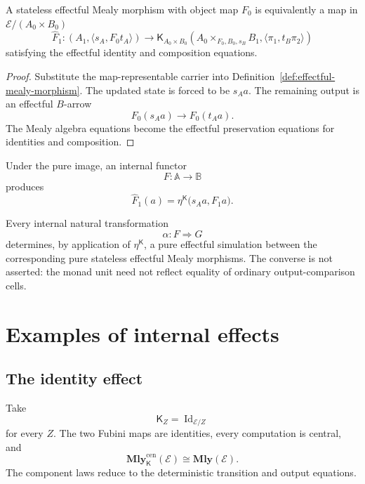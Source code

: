 \begin{proposition}
\label{prop:stateless-effectful-mealy}
A stateless effectful Mealy morphism with object map \(F_0\) is equivalently
a map in \(\mathcal E/(A_0\times B_0)\)
\[
\widehat F_1:
\left(
    A_1,
    \langle s_A,F_0t_A\rangle
\right)
\longrightarrow
\mathsf K_{A_0\times B_0}
\left(
    A_0\times_{F_0,B_0,s_B}B_1,
    \langle\pi_1,t_B\pi_2\rangle
\right)
\]
satisfying the effectful identity and composition equations.
\end{proposition}

\begin{proof}
Substitute the map-representable carrier into
Definition~\ref{def:effectful-mealy-morphism}.  The updated state is forced
to be \(s_Aa\).  The remaining output is an effectful \(B\)-arrow
\[
    F_0(s_Aa)\longrightarrow F_0(t_Aa).
\]
The Mealy algebra equations become the effectful preservation equations for
identities and composition.
\end{proof}

Under the pure image, an internal functor
\[
    F:\mathbb A\longrightarrow\mathbb B
\]
produces
\[
    \widehat F_1(a)
    =
    \eta^{\mathsf K}
    \bigl(
        s_Aa,
        F_1a
    \bigr).
\]

Every internal natural transformation
\[
    \alpha:F\Rightarrow G
\]
determines, by application of \(\eta^{\mathsf K}\), a pure effectful
simulation between the corresponding pure stateless effectful Mealy
morphisms.  The converse is not asserted: the monad unit need not reflect
equality of ordinary output-comparison cells.

\section{Examples of internal effects}
\label{sec:examples-internal-effects}

\subsection{The identity effect}
\label{subsec:identity-effect-example}

Take
\[
    \mathsf K_Z
    =
    \operatorname{Id}_{\mathcal E/Z}
\]
for every \(Z\).  The two Fubini maps are identities, every computation is
central, and
\[
    \mathbf{Mly}^{\mathrm{cen}}_{\mathsf K}(\mathcal E)
    \cong
    \mathbf{Mly}(\mathcal E).
\]
The component laws reduce to the deterministic transition and output
equations.


